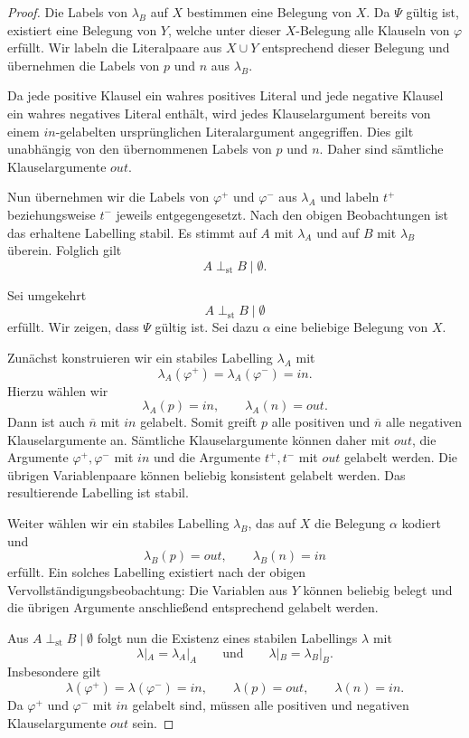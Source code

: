 \begin{proof}
Die Labels von \(\lambda_B\) auf \(X\) bestimmen eine Belegung von \(X\).
Da \(\Psi\) gültig ist, existiert eine Belegung von \(Y\), welche unter
dieser \(X\)-Belegung alle Klauseln von \(\varphi\) erfüllt. Wir labeln
die Literalpaare aus \(X\cup Y\) entsprechend dieser Belegung und
übernehmen die Labels von \(p\) und \(n\) aus \(\lambda_B\).

Da jede positive Klausel ein wahres positives Literal und jede negative
Klausel ein wahres negatives Literal enthält, wird jedes Klauselargument
bereits von einem \(\mathit{in}\)-gelabelten ursprünglichen
Literalargument angegriffen. Dies gilt unabhängig von den übernommenen
Labels von \(p\) und \(n\). Daher sind sämtliche Klauselargumente
\(\mathit{out}\).

Nun übernehmen wir die Labels von \(\varphi^+\) und \(\varphi^-\) aus
\(\lambda_A\) und labeln \(t^+\) beziehungsweise \(t^-\) jeweils
entgegengesetzt. Nach den obigen Beobachtungen ist das erhaltene Labelling
stabil. Es stimmt auf \(A\) mit \(\lambda_A\) und auf \(B\) mit
\(\lambda_B\) überein. Folglich gilt
\[
    A\perp_{\mathrm{st}}B\mid\emptyset.
\]

Sei umgekehrt
\[
    A\perp_{\mathrm{st}}B\mid\emptyset
\]
erfüllt. Wir zeigen, dass \(\Psi\) gültig ist. Sei dazu
\(\alpha\) eine beliebige Belegung von \(X\).

Zunächst konstruieren wir ein stabiles Labelling \(\lambda_A\) mit
\[
    \lambda_A(\varphi^+)
    =
    \lambda_A(\varphi^-)
    =
    \mathit{in}.
\]
Hierzu wählen wir
\[
    \lambda_A(p)=\mathit{in},
    \qquad
    \lambda_A(n)=\mathit{out}.
\]
Dann ist auch \(\overline n\) mit \(\mathit{in}\) gelabelt. Somit greift
\(p\) alle positiven und \(\overline n\) alle negativen
Klauselargumente an. Sämtliche Klauselargumente können daher mit
\(\mathit{out}\), die Argumente \(\varphi^+,\varphi^-\) mit
\(\mathit{in}\) und die Argumente \(t^+,t^-\) mit
\(\mathit{out}\) gelabelt werden. Die übrigen Variablenpaare können
beliebig konsistent gelabelt werden. Das resultierende Labelling ist
stabil.

Weiter wählen wir ein stabiles Labelling \(\lambda_B\), das auf \(X\)
die Belegung \(\alpha\) kodiert und
\[
    \lambda_B(p)=\mathit{out},
    \qquad
    \lambda_B(n)=\mathit{in}
\]
erfüllt. Ein solches Labelling existiert nach der obigen
Vervollständigungsbeobachtung: Die Variablen aus \(Y\) können beliebig
belegt und die übrigen Argumente anschließend entsprechend gelabelt
werden.

Aus
\(A\perp_{\mathrm{st}}B\mid\emptyset\) folgt nun die Existenz eines
stabilen Labellings \(\lambda\) mit
\[
    \lambda|_A=\lambda_A|_A
    \qquad\text{und}\qquad
    \lambda|_B=\lambda_B|_B.
\]
Insbesondere gilt
\[
    \lambda(\varphi^+)
    =
    \lambda(\varphi^-)
    =
    \mathit{in},
    \qquad
    \lambda(p)=\mathit{out},
    \qquad
    \lambda(n)=\mathit{in}.
\]
Da \(\varphi^+\) und \(\varphi^-\) mit \(\mathit{in}\) gelabelt sind,
müssen alle positiven und negativen Klauselargumente
\(\mathit{out}\) sein.


\end{proof}
